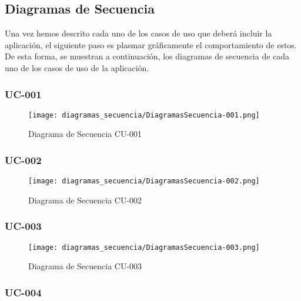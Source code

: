 \subsection{Diagramas de Secuencia}

Una vez hemos descrito cada uno de los casos de uso que deberá incluir la
aplicación, el siguiente paso es plasmar gráficamente el comportamiento de
estos. De esta forma, se muestran a continuación, los diagramas de secuencia de
cada uno de los casos de uso de la aplicación.

\newpage

\subsubsection{UC-001 }

\begin{figure}[H]
    \begin{center}
        \texttt{[image: diagramas\_secuencia/DiagramasSecuencia-001.png]}
    \end{center}
    \caption{Diagrama de Secuencia CU-001}
    \label{fig:DSCU-001}
\end{figure}

\subsubsection{UC-002 }

\begin{figure}[H]
    \begin{center}
        \texttt{[image: diagramas\_secuencia/DiagramasSecuencia-002.png]}
    \end{center}
    \caption{Diagrama de Secuencia CU-002}
    \label{fig:DSCU-002}
\end{figure}

\subsubsection{UC-003 }

\begin{figure}[H]
    \begin{center}
        \texttt{[image: diagramas\_secuencia/DiagramasSecuencia-003.png]}
    \end{center}
    \caption{Diagrama de Secuencia CU-003}
    \label{fig:DSCU-003}
\end{figure}

\subsubsection{UC-004 }

